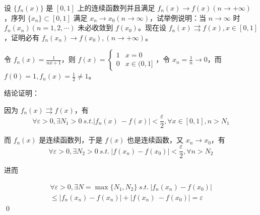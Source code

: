 \begin{ques}
	设 $\displaystyle \{f_{n}( x)\}$ 是 $\displaystyle [ 0,1]$ 上的连续函数列并且满足 $\displaystyle f_{n}( x)\rightarrow f( x)\left( n\rightarrow +\infty \right)$，序列 $\displaystyle \{x_{n}\} \subset [ 0,1]$ 满足 $\displaystyle x_{n}\rightarrow x_{0}\left( n\rightarrow \infty \right)$，试举例说明：当 $\displaystyle n\rightarrow \infty $ 时 $\displaystyle f_{n}( x_{n})( n=1,2,\cdots )$ 未必收敛到 $\displaystyle f( x_{0})$。现在设 $\displaystyle f_{n}( x) \rightrightarrows f( x) ,x\in [ 0,1]$，证明必有 $\displaystyle f_{n}( x_{n})\rightarrow f( x_{0}) ,\left( n\rightarrow +\infty \right)$。
\end{ques}





令 $\displaystyle f_{n}( x) =\frac{1}{nx+1}$，则 $\displaystyle f( x) =\begin{cases}
	1 & x=0\\
	0 & x\in ( 0,1]
\end{cases}$，令 $\displaystyle x_{n} =\frac{1}{n}\rightarrow 0$，而 $\displaystyle f( 0) =1,f_{n}( x) =\frac{1}{2} \neq 1$。



结论证明：

因为 $\displaystyle f_{n}( x) \rightrightarrows f( x)$，有
\begin{equation*}
	\forall \varepsilon  >0,\exists N_{1}  >0\ s.t.|f_{n}( x) \ -f( x) |< \frac{\varepsilon }{2} ,\forall x\in [ 0,1] ,n >N_{1}
\end{equation*}


而 $\displaystyle f_{n}( x)$ 是连续函数列，于是 $\displaystyle f( x)$ 也是连续函数，又 $\displaystyle x_{n}\rightarrow x_{0}$，有
\begin{equation*}
	\forall \varepsilon  >0,\exists N_{2}  >0\ s.t.\ |f( x_{n}) -f( x_{0}) |< \frac{\varepsilon }{2} ,\forall n >N_{2}
\end{equation*}


进而



\begin{gather*}
	\forall \varepsilon  >0,\exists N=\max\{N_{1} ,N_{2}\} \ s.t.\ |f_{n}( x_{n}) -f( x_{0}) |\\
	\leqslant |f_{n}( x_{n}) -f( x_{n}) |+|f( x_{n}) \ -f( x_{0}) |=\varepsilon 
\end{gather*}\qed 





